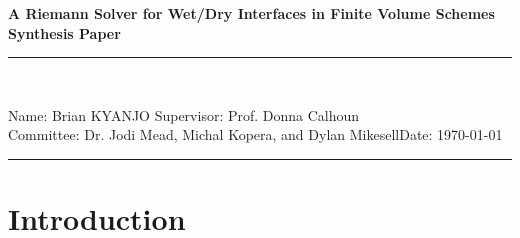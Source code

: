 \documentclass[9pt,a4paper]{article}
\newcommand{\student}{Brian KYANJO }
\newcommand{\course}{Dr. Jodi Mead, Michal Kopera, and Dylan Mikesell}
\newcommand{\assignment}{ Prof. Donna Calhoun}
\begin{document}
	
	\thispagestyle{empty}
	\begin{center}
		\textbf{A Riemann Solver for Wet/Dry Interfaces in Finite Volume Schemes\\[0.5cm]
			Synthesis Paper}
		\vspace{.2cm}
	\end{center}
	
	
	\begin{center}
		\rule{17cm}{0.2cm}\\[0.3cm]
	\end{center}	
	
	\noindent	Name: \student \hfill Supervisor: \assignment\\[0.1cm]
	Committee: \course \hfill Date: \today\\
	\rule{17cm}{0.05cm}
	\vspace{.2cm}
	
	\section{Introduction}
	
	
	
		
	
	
\end{document}
